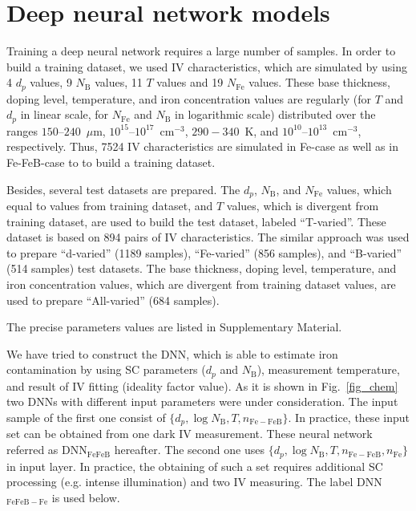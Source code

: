 \documentclass[a4paper,fleqn]{cas-sc}
\begin{document}
\section{Deep neural network models}

Training a deep neural network requires a large number of samples.
In order to build a training dataset, we used IV characteristics, which
are simulated by using 4 $d_p$ values, 9 $N_\mathrm{B}$ values, 11 $T$ values and 19 $N_{\mathrm{Fe}}$ values.
These base thickness, doping level, temperature, and iron concentration values are regularly (for $T$ and $d_p$ in linear scale, for $N_{\mathrm{Fe}}$ and $N_\mathrm{B}$ in logarithmic scale) distributed over the  ranges $150$--$240$~$\mu$m, $10^{15}$--$10^{17}$~cm$^{-3}$, $290-340$~K, and
$10^{10}$--$10^{13}$~cm$^{-3}$, respectively.
Thus, 7524 IV characteristics are simulated in Fe-case as well as in Fe-FeB-case to to build a training dataset.

Besides, several test datasets are prepared.
The $d_p$, $N_\mathrm{B}$, and $N_{\mathrm{Fe}}$ values, which equal to  values from training dataset, and $T$ values, which is divergent from training dataset, are used to build the test dataset, labeled ``T-varied''.
These dataset is based on 894 pairs of IV characteristics.
The similar approach was used to prepare ``d-varied'' (1189 samples), ``Fe-varied'' (856 samples), and ``B-varied'' (514 samples) test datasets.
The base thickness, doping level, temperature, and iron concentration values, which are divergent from training dataset values, are used to prepare ``All-varied'' (684 samples).

The precise parameters values are listed in  Supplementary Material.

We have tried to construct the DNN, which is able to estimate iron contamination by using
SC parameters ($d_p$ and $N_\mathrm{B}$),  measurement temperature, and result of IV fitting (ideality factor value).
As it is shown in Fig.~\ref{fig_chem} two DNNs with different input parameters were under consideration.
The input sample of the first one consist of $\{d_p,\log N_\mathrm{B},T,n_\mathrm{Fe-FeB}\}$.
In practice, these input set can be obtained from one dark IV measurement.
These neural network referred as DNN$_\mathrm{FeFeB}$ hereafter.
The second one uses  $\{d_p,\log N_\mathrm{B},T,n_\mathrm{Fe-FeB},n_\mathrm{Fe}\}$ in input layer.
In practice, the obtaining of such a set requires additional SC processing (e.g. intense illumination) and two IV measuring.
The label  DNN$_\mathrm{FeFeB-Fe}$ is used below.
\end{document}
